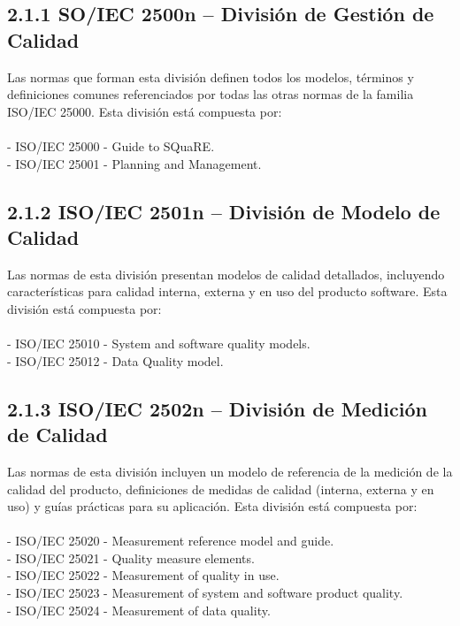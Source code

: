 \documentclass[https://www.overleaf.com/project/63761df255a8a9f4a15c3579
	letterpaper, %
	10pt, %
]{CSUniSchoolLabReport}
\begin{document}
        \subsection*{2.1.1 \hspace{0.5em} SO/IEC 2500n – División de Gestión de Calidad}
            Las normas que forman esta división definen todos los modelos, términos y definiciones comunes referenciados por todas las otras normas de la familia ISO/IEC 25000.  Esta división está compuesta por:
            \\\\
            - ISO/IEC 25000 - Guide to SQuaRE.
            \\
            - ISO/IEC 25001 - Planning and Management.

        \subsection*{2.1.2 \hspace{0.5em} ISO/IEC 2501n – División de Modelo de Calidad}
            Las normas de esta división presentan modelos de calidad detallados, incluyendo características para calidad interna, externa y en uso del producto software. Esta división está compuesta por:
            \\\\
            - ISO/IEC 25010 - System and software quality models.
            \\
            - ISO/IEC 25012 - Data Quality model.

        \subsection*{2.1.3 \hspace{0.5em} ISO/IEC 2502n – División de Medición de Calidad}
            Las normas de esta división incluyen un modelo de referencia de la medición de la calidad del producto, definiciones de medidas de calidad (interna, externa y en uso) y guías prácticas para su aplicación. Esta división está compuesta por:
            \\\\
            - ISO/IEC 25020 - Measurement reference model and guide.
            \\
            - ISO/IEC 25021 - Quality measure elements.
            \\
            - ISO/IEC 25022 - Measurement of quality in use.
            \\
            - ISO/IEC 25023 - Measurement of system and software product quality.
            \\
            - ISO/IEC 25024 - Measurement of data quality.
\end{document}
